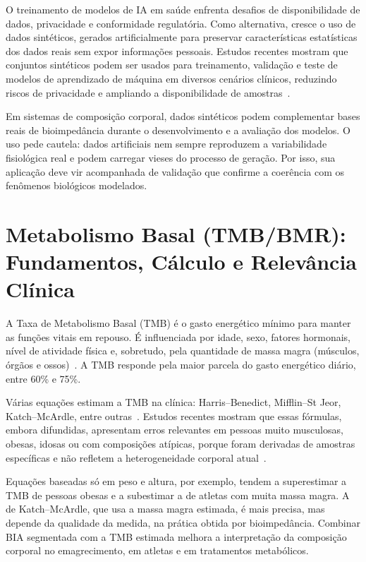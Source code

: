 O treinamento de modelos de IA em saúde enfrenta desafios de disponibilidade de dados,
privacidade e conformidade regulatória. Como alternativa, cresce o uso de dados
sintéticos, gerados artificialmente para preservar características estatísticas dos dados
reais sem expor informações pessoais. Estudos recentes mostram que conjuntos sintéticos
podem ser usados para treinamento, validação e teste de modelos de aprendizado de máquina
em diversos cenários clínicos, reduzindo riscos de privacidade e ampliando a
disponibilidade de amostras~\cite{gonzalez2023}.

Em sistemas de composição corporal, dados sintéticos podem complementar bases reais de
bioimpedância durante o desenvolvimento e a avaliação dos modelos. O uso pede cautela:
dados artificiais nem sempre reproduzem a variabilidade fisiológica real e podem carregar
vieses do processo de geração. Por isso, sua aplicação deve vir acompanhada de validação
que confirme a coerência com os fenômenos biológicos modelados.

\section{Metabolismo Basal (TMB/BMR): Fundamentos, Cálculo e Relevância Clínica}

A Taxa de Metabolismo Basal (TMB) é o gasto energético mínimo para manter as funções
vitais em repouso. É influenciada por idade, sexo, fatores hormonais, nível de atividade
física e, sobretudo, pela quantidade de massa magra (músculos, órgãos e ossos)~\cite{cunningham1991}.
A TMB responde pela maior parcela do gasto energético diário, entre 60\% e 75\%.

Várias equações estimam a TMB na clínica: Harris--Benedict, Mifflin--St Jeor,
Katch--McArdle, entre outras~\cite{wenna2023}. Estudos recentes mostram que essas fórmulas,
embora difundidas, apresentam erros relevantes em pessoas muito musculosas, obesas,
idosas ou com composições atípicas, porque foram derivadas de amostras específicas e não
refletem a heterogeneidade corporal atual~\cite{franks2023,henry2005}.

Equações baseadas só em peso e altura, por exemplo, tendem a superestimar a TMB de pessoas
obesas e a subestimar a de atletas com muita massa magra. A de Katch--McArdle, que usa a
massa magra estimada, é mais precisa, mas depende da qualidade da medida, na prática
obtida por bioimpedância. Combinar BIA segmentada com a TMB estimada melhora a
interpretação da composição corporal no emagrecimento, em atletas e em tratamentos
metabólicos.

